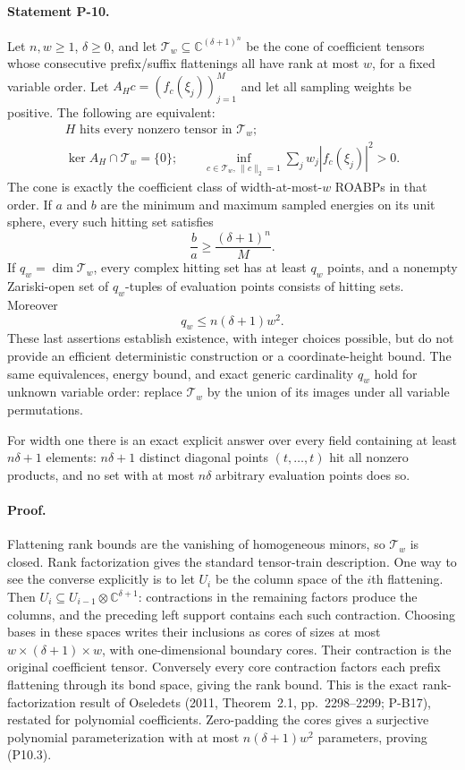 \documentclass[11pt,a4paper]{article}
\theoremstyle{definition}\newtheorem{definition}{Definition}
\begin{document}
\paragraph{Statement P-10.}
Let $n,w\ge1$, $\delta\ge0$, and let $\mathcal T_w\subseteq\mathbb C^{(\delta+1)^n}$ be the cone of coefficient tensors whose consecutive prefix/suffix flattenings all have rank at most $w$, for a fixed variable order. Let $A_Hc=(f_c(\xi_j))_{j=1}^M$ and let all sampling weights be positive. The following are equivalent:
\[
\begin{gathered}
 H\text{ hits every nonzero tensor in }\mathcal T_w;\\
 \ker A_H\cap\mathcal T_w=\{0\};\qquad
 \inf_{c\in\mathcal T_w,\,\|c\|_2=1}
       \sum_jw_j|f_c(\xi_j)|^2>0.
\end{gathered}
 \tag{P10.1}
\]
The cone is exactly the coefficient class of width-at-most-$w$ ROABPs in that order. If $a$ and $b$ are the minimum and maximum sampled energies on its unit sphere, every such hitting set satisfies
\[
 \frac ba\ge\frac{(\delta+1)^n}{M}.
 \tag{P10.2}
\]
If $q_w=\dim\mathcal T_w$, every complex hitting set has at least $q_w$ points, and a nonempty Zariski-open set of $q_w$-tuples of evaluation points consists of hitting sets. Moreover
\[
 q_w\le n(\delta+1)w^2.
 \tag{P10.3}
\]
These last assertions establish existence, with integer choices possible, but do not provide an efficient deterministic construction or a coordinate-height bound.
The same equivalences, energy bound, and exact generic cardinality $q_w$ hold for unknown variable order: replace $\mathcal T_w$ by the union of its images under all variable permutations.

For width one there is an exact explicit answer over every field containing at least $n\delta+1$ elements: $n\delta+1$ distinct diagonal points $(t,\ldots,t)$ hit all nonzero products, and no set with at most $n\delta$ arbitrary evaluation points does so.
\paragraph{Proof.}
Flattening rank bounds are the vanishing of homogeneous minors, so $\mathcal T_w$ is closed. Rank factorization gives the standard tensor-train description. One way to see the converse explicitly is to let $U_i$ be the column space of the $i$th flattening. Then
$U_i\subseteq U_{i-1}\otimes\mathbb C^{\delta+1}$: contractions in the remaining factors produce the columns, and the preceding left support contains each such contraction. Choosing bases in these spaces writes their inclusions as cores of sizes at most $w\times(\delta+1)\times w$, with one-dimensional boundary cores. Their contraction is the original coefficient tensor. Conversely every core contraction factors each prefix flattening through its bond space, giving the rank bound. This is the exact rank-factorization result of Oseledets (2011, Theorem~2.1, pp.~2298--2299; P-B17), restated for polynomial coefficients. Zero-padding the cores gives a surjective polynomial parameterization with at most $n(\delta+1)w^2$ parameters, proving (P10.3).
\end{document}
